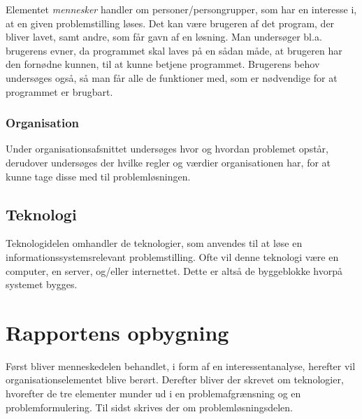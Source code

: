 Elementet \textit{mennesker} handler om personer/persongrupper, som har en interesse i, at en given
problemstilling løses. Det kan være brugeren af det program, der bliver lavet, samt andre, som får gavn af en
løsning. Man undersøger bl.a. brugerens evner, da programmet skal laves på en sådan måde, at brugeren har den
fornødne kunnen, til at kunne betjene programmet. Brugerens behov undersøges også, så man får alle de
funktioner med, som er nødvendige for at programmet er brugbart.


\subsubsection{Organisation}\label{subsec:organisation}

Under organisationsafsnittet undersøges hvor og hvordan problemet opstår, derudover undersøges der hvilke
regler og værdier organisationen har, for at kunne tage disse med til problemløsningen.


\cbstart
\subsection{Teknologi}\label{subsec:Teknologi}

Teknologidelen omhandler de teknologier, som anvendes til at løse en informationssystemsrelevant
problemstilling. Ofte vil denne teknologi være en computer,
en server, og/eller internettet. Dette er altså de byggeblokke hvorpå systemet bygges.
\cbend



\section{Rapportens opbygning}\label{sec:rapportens-opbygning}

Først bliver menneskedelen behandlet, i form af en interessentanalyse, herefter vil organisationselementet
blive berørt. Derefter bliver der skrevet om teknologier, hvorefter de tre elementer munder ud i en
problemafgrænsning og en problemformulering. Til sidst skrives der om problemløsningsdelen. 
